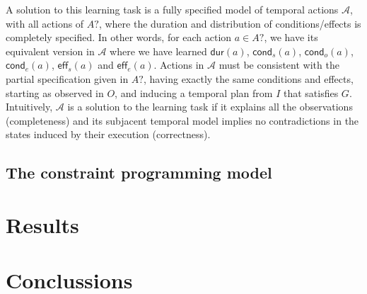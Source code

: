 \documentclass{ecai}
\newcommand{\eff}{\mathsf{eff}}    %
\newcommand{\cond}{\mathsf{cond}}  %
\newcommand{\dur}{\mathsf{dur}}    %
\begin{document}
A solution to this learning task is a fully specified model of temporal actions $\mathcal{A}$, with all actions of $A?$, where the duration and distribution of conditions/effects is completely specified. In other words, for each action $a \in A?$, we have its equivalent version in $\mathcal{A}$ where we have learned $\dur(a)$, $\cond_s(a)$, $\cond_o(a)$, $\cond_e(a)$, $\eff_s(a)$ and $\eff_e(a)$.
Actions in $\mathcal{A}$ must be consistent with the partial specification given in $A?$, having exactly the same conditions and effects, starting as observed in $O$, and inducing a temporal plan from $I$ that satisfies $G$. Intuitively, $\mathcal{A}$ is a solution to the learning task if it explains all the observations (completeness) and its subjacent temporal model implies no contradictions in the states induced by their execution (correctness).


\subsection{The constraint programming model}



\section{Results}

\section{Conclussions}
  



\end{document}
